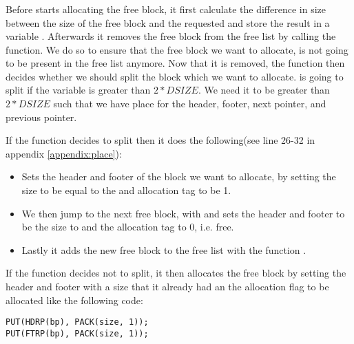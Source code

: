 \subsubsection{}
Before  starts allocating the free block, it first calculate the difference in size between the size of the free block and the requested and store the result in a variable .
Afterwards it removes the free block from the free list by calling the  function. We do so to ensure that the free block we want to allocate, 
is not going to be present in the free list anymore. Now that it is removed, the function then decides whether we should split the block which we want to allocate. 
 is going to split if the variable  is greater than $2 * DSIZE$.
We need it to be greater than $2 * DSIZE$ such that we have place for the header, footer, next pointer, and previous pointer. 

If the function decides to split then it does the following(see line 26-32 in appendix \ref{appendix:place}): 
\begin{itemize}
    \item Sets the header and footer of the block we want to allocate, by setting the size to be equal to the  and allocation tag to be 1.
    \item We then jump to the next free block, with  and sets the header and footer to be the size to  and the allocation tag to 0, i.e. free.
    \item Lastly it adds the new free block to the free list with the function .
\end{itemize}

If the  function decides not to split, it then allocates the free block by setting the header and footer with a size that it already had an the allocation flag to be allocated like the following code:
\begin{lstlisting}
PUT(HDRP(bp), PACK(size, 1));
PUT(FTRP(bp), PACK(size, 1)); 
\end{lstlisting}

